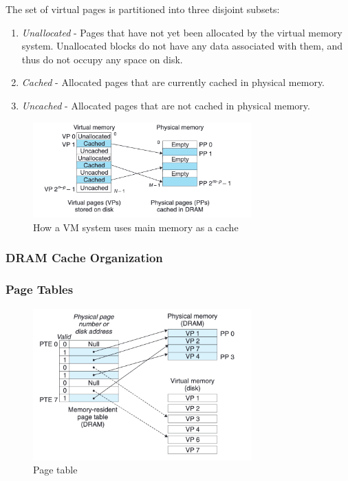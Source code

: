 \documentclass[12pt]{article}
\begin{document}
The set of virtual pages is partitioned into three disjoint subsets:
\begin{enumerate}
    \item \textit{Unallocated} - Pages that have not yet been allocated by the virtual memory system. Unallocated blocks do not have any data associated with them, and thus do not occupy any space on disk.
    \item \textit{Cached} - Allocated pages that are currently cached in physical memory.
    \item \textit{Uncached} - Allocated pages that are not cached in physical memory.
\end{enumerate}

\begin{figure}[H]
    \centering
    \includegraphics[width=0.75\textwidth]{graphics/Figure 4.3.png}
    \caption{How a VM system uses main memory as a cache}
    \label{fig:43}
\end{figure}

\subsubsection*{DRAM Cache Organization}



\subsubsection*{Page Tables}

\begin{figure}[H]
    \centering
    \includegraphics[width=0.75\textwidth]{graphics/Figure 4.4.png}
    \caption{Page table}
    \label{fig:44}
\end{figure}
\end{document}
